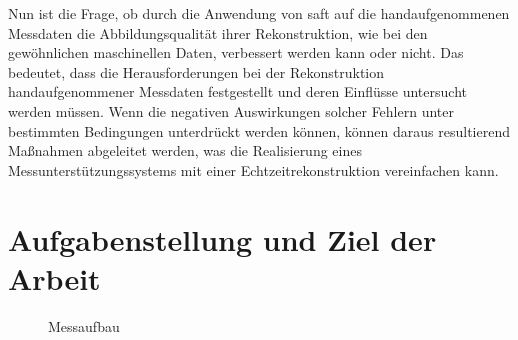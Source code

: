 Nun ist die Frage, ob durch die Anwendung von \acrshort{saft} auf die handaufgenommenen Messdaten die Abbildungsqualität ihrer Rekonstruktion, wie bei den gewöhnlichen maschinellen Daten, verbessert werden kann oder nicht. Das bedeutet, dass die Herausforderungen bei der Rekonstruktion handaufgenommener Messdaten festgestellt und deren Einflüsse untersucht werden müssen. Wenn die negativen Auswirkungen solcher Fehlern unter bestimmten Bedingungen unterdrückt werden können, können daraus resultierend Maßnahmen abgeleitet werden, was die Realisierung eines Messunterstützungssystems mit einer Echtzeitrekonstruktion vereinfachen kann. \par


\section{Aufgabenstellung und Ziel der Arbeit} \label{sec:thesis_scope}
\begin{figure}[h!]
\begin{center}
\caption{Messaufbau}
\label{fig:smart_inspect}
\end{center}
\end{figure}

